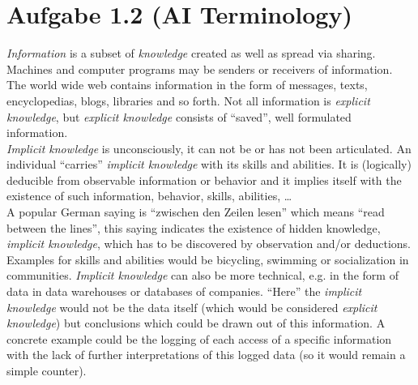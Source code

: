\documentclass[10pt,a4paper]{article}
\begin{document}
	
	
	
	\section*{Aufgabe 1.2 (AI Terminology)}

		\textit{Information} is a subset of \textit{knowledge} created as well as spread via sharing. Machines and computer programs may be senders or receivers of information. The world wide web contains information in the form of messages, texts, encyclopedias, blogs, libraries and so forth. Not all information is \textit{explicit knowledge}, but \textit{explicit knowledge} consists of \enquote{saved}, well formulated information. 
		\\

		
		\noindent \textit{Implicit knowledge} is unconsciously, it can not be or has not been articulated. An individual \enquote{carries} \textit{implicit knowledge} with its skills and abilities. It is (logically) deducible from observable information or behavior and it implies itself with the existence of such information, behavior, skills, abilities, \dots
		\\
		A popular German saying is \enquote{zwischen den Zeilen lesen} which means \enquote{read between the lines}, this saying indicates the existence of hidden knowledge, \textit{implicit knowledge}, which has to be discovered by observation and/or deductions.
		\\
		Examples for skills and abilities would be bicycling, swimming or socialization in communities. \textit{Implicit knowledge} can also be more technical, e.g. in the form of data in data warehouses or databases of companies. \enquote{Here} the \textit{implicit knowledge} would not be the data itself (which would be considered \textit{explicit knowledge}) but conclusions which could be drawn out of this information. A concrete example could be the logging of each access of a specific information with the lack of further interpretations of this logged data (so it would remain a simple counter).
		\\
		
\end{document}
